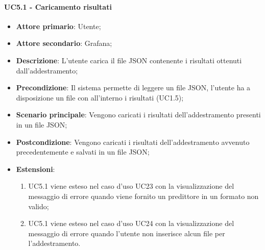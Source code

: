 \paragraph{UC5.1 - Caricamento risultati}
\label{para:uc5.1}
\begin{itemize}
  \item \textbf{Attore primario}: Utente;
  \item \textbf{Attore secondario}: Grafana;
  \item \textbf{Descrizione}: L'utente carica il file JSON contenente i risultati ottenuti dall'addestramento;
  \item \textbf{Precondizione}: Il sistema permette di leggere un file JSON, l'utente ha a disposizione un file con all'interno i risultati (UC1.5);
  \item \textbf{Scenario principale}: Vengono caricati i risultati dell'addestramento presenti in un file JSON;
  \item \textbf{Postcondizione}: Vengono caricati i risultati dell'addestramento avvenuto precedentemente e salvati in un file JSON;
  \item \textbf{Estensioni}:
  \begin{enumerate}
    \item UC5.1 viene esteso nel caso d'uso UC23 con la visualizzazione del messaggio di errore quando viene fornito un predittore in un formato non valido;
    \item UC5.1 viene esteso nel caso d'uso UC24 con la visualizzazione del messaggio di errore quando l'utente non inserisce alcun file per l'addestramento.
    \end{enumerate}
\end{itemize}

